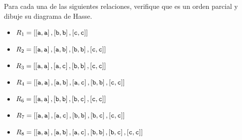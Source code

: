 	\begin{problema}
		Para cada una de las siguientes relaciones, verifique que es un orden parcial y dibuje su diagrama de Hasse.
	\end{problema}
	\begin{itemize}
		\item $\displaystyle R_{1}= \left[\left[\text{\texttt{a}}, \text{\texttt{a}}\right], \left[\text{\texttt{b}}, \text{\texttt{b}}\right], \left[\text{\texttt{c}}, \text{\texttt{c}}\right]\right] $
		\item $\displaystyle R_{2}= \left[\left[\text{\texttt{a}}, \text{\texttt{a}}\right], \left[\text{\texttt{a}}, \text{\texttt{b}}\right], \left[\text{\texttt{b}}, \text{\texttt{b}}\right], \left[\text{\texttt{c}}, \text{\texttt{c}}\right]\right] $
		\item $\displaystyle R_{3}= \left[\left[\text{\texttt{a}}, \text{\texttt{a}}\right], \left[\text{\texttt{a}}, \text{\texttt{c}}\right], \left[\text{\texttt{b}}, \text{\texttt{b}}\right], \left[\text{\texttt{c}}, \text{\texttt{c}}\right]\right] $
		\item $\displaystyle R_{4}= \left[\left[\text{\texttt{a}}, \text{\texttt{a}}\right], \left[\text{\texttt{a}}, \text{\texttt{b}}\right], \left[\text{\texttt{a}}, \text{\texttt{c}}\right], \left[\text{\texttt{b}}, \text{\texttt{b}}\right], \left[\text{\texttt{c}}, \text{\texttt{c}}\right]\right] $
		\item $\displaystyle R_{6}= \left[\left[\text{\texttt{a}}, \text{\texttt{a}}\right], \left[\text{\texttt{b}}, \text{\texttt{b}}\right], \left[\text{\texttt{b}}, \text{\texttt{c}}\right], \left[\text{\texttt{c}}, \text{\texttt{c}}\right]\right] $
		\item $\displaystyle R_{7}= \left[\left[\text{\texttt{a}}, \text{\texttt{a}}\right], \left[\text{\texttt{a}}, \text{\texttt{c}}\right], \left[\text{\texttt{b}}, \text{\texttt{b}}\right], \left[\text{\texttt{b}}, \text{\texttt{c}}\right], \left[\text{\texttt{c}}, \text{\texttt{c}}\right]\right] $
		\item $\displaystyle R_{8}= \left[\left[\text{\texttt{a}}, \text{\texttt{a}}\right], \left[\text{\texttt{a}}, \text{\texttt{b}}\right], \left[\text{\texttt{a}}, \text{\texttt{c}}\right], \left[\text{\texttt{b}}, \text{\texttt{b}}\right], \left[\text{\texttt{b}}, \text{\texttt{c}}\right], \left[\text{\texttt{c}}, \text{\texttt{c}}\right]\right] $
	\end{itemize}
	



